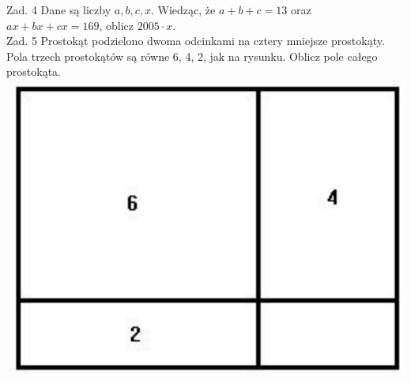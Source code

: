 \documentclass[10pt]{article}
\begin{document}
Zad. 4 Dane są liczby \(a, b, c, x\). Wiedząc, że \(a+b+c=13\) oraz \(a x+b x+c x=169\), oblicz \(2005 \cdot x\).\\
Zad. 5 Prostokąt podzielono dwoma odcinkami na cztery mniejsze prostokąty. Pola trzech prostokątów są równe 6, 4, 2, jak na rysunku. Oblicz pole całego prostokąta.\\
\includegraphics[max width=\textwidth, center]{2024_11_21_2558362c2bd32ec13884g-1}
\end{document}
